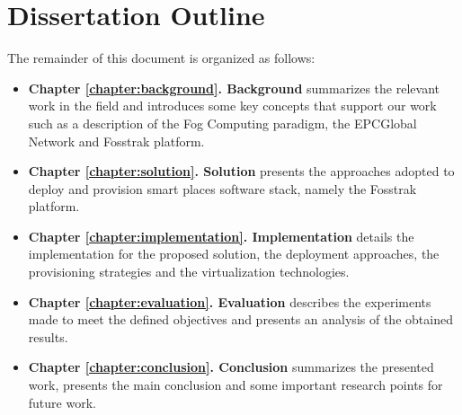 \section{Dissertation Outline}
\label{section:outline}
The remainder of this document is organized as follows:
\begin{itemize}
  \item \textbf{Chapter \ref{chapter:background}. Background} summarizes the relevant work in the field and
  introduces some key concepts that support our work such as a description of the Fog Computing paradigm,
  the EPCGlobal Network and Fosstrak platform.
  \item \textbf{Chapter \ref{chapter:solution}. Solution} presents the approaches adopted to deploy
  and provision smart places software stack, namely the Fosstrak platform.
  \item \textbf{Chapter \ref{chapter:implementation}. Implementation} details the implementation
  for the proposed solution, the deployment approaches, the provisioning strategies and the virtualization
  technologies.
  \item \textbf{Chapter \ref{chapter:evaluation}. Evaluation} describes the experiments made to meet
  the defined objectives and presents an analysis of the obtained results.
  \item \textbf{Chapter \ref{chapter:conclusion}. Conclusion} summarizes the presented work,
  presents the main conclusion and some important research points for future work.
\end{itemize}
